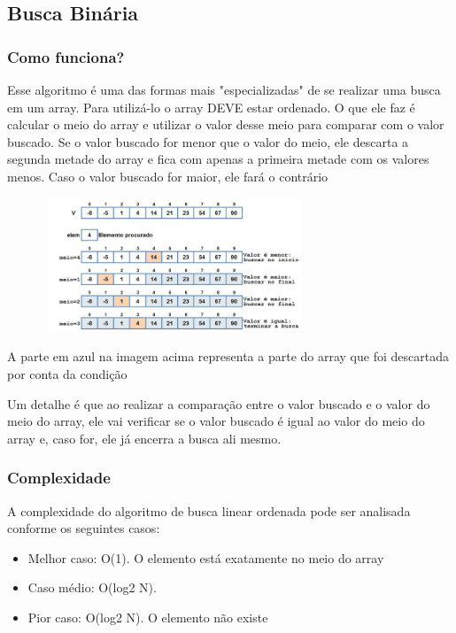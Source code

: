 \documentclass{report}
\begin{document}
	\subsection{Busca Binária}
	
	\subsubsection{Como funciona?}
	
	Esse algoritmo é uma das formas mais "especializadas" de se realizar uma busca em um array. Para utilizá-lo o array DEVE estar ordenado. O que ele faz é calcular o meio do array e utilizar o valor desse meio para comparar com o valor buscado. Se o valor buscado for menor que o valor do meio, ele descarta a segunda metade do array e fica com apenas a primeira metade com os valores menos. Caso o valor buscado for maior, ele fará o contrário
	
	\begin{center}
		
		\includegraphics[width=10cm,height=4cm,keepaspectratio=false]{imagens/bbinaria.png}
		
	\end{center}
	
	A parte em azul na imagem acima representa a parte do array que foi descartada por conta da condição
	
	
	Um detalhe é que ao realizar a comparação entre o valor buscado e o valor do meio do array, ele vai verificar se o valor buscado é igual ao valor do meio do array e, caso for, ele já encerra a busca ali mesmo.
	
	\subsubsection{Complexidade}
	
	A complexidade do algoritmo de busca linear ordenada pode ser analisada conforme os seguintes casos:
	
	\begin{itemize}
		\item Melhor caso: O(1). O elemento está exatamente no meio do array
		\item Caso médio: O(log2 N). 
		\item Pior caso: O(log2 N). O elemento não existe
	\end{itemize}
	
\end{document}
